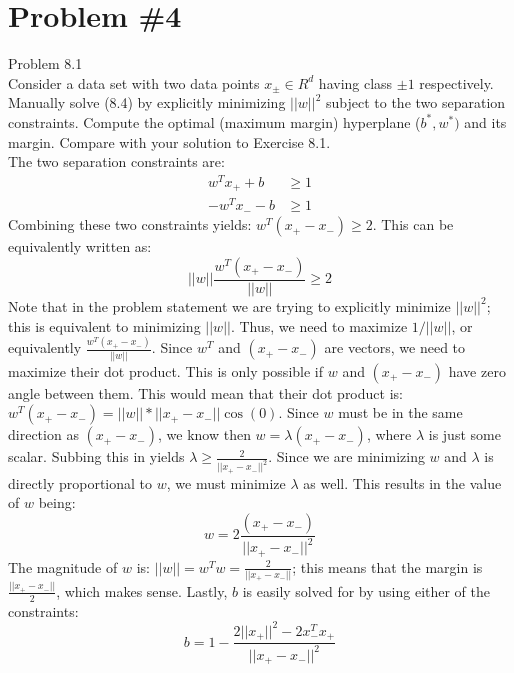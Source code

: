 \documentclass[12pt]{article}
\begin{document}
	\section*{Problem \#4}
	Problem 8.1 \\
	Consider a data set with two data points $x_{\pm} \in R^d$ having class $\pm1$ respectively. Manually solve (8.4) by explicitly minimizing $||w||^2$
	subject to the two separation constraints.
	Compute the optimal (maximum margin) hyperplane ($b^* , w^* )$ and its margin.
	Compare with your solution to Exercise 8.1. \\
	The two separation constraints are:
	\begin{align*}
		w^Tx_+ + b &\ge 1 \\
		-w^Tx_- -b &\ge 1  
	\end{align*}
	Combining these two constraints yields: $w^T(x_+ - x_-) \ge 2$. This can be equivalently written as:
	\begin{equation*}
		||w|| \frac{w^T(x_+ - x_-)}{||w||} \ge 2
	\end{equation*}
	Note that in the problem statement we are trying to explicitly minimize $||w||^2$; this is equivalent to minimizing $||w||$. Thus, we need to maximize $1/||w||$, or equivalently $\frac{w^T(x_+ - x_-)}{||w||}$. Since $w^T$ and $(x_+ -x_-)$ are vectors, we need to maximize their dot product. This is only possible if $w$ and $(x_+ -x_-)$ have zero angle between them. This would mean that their dot product is: $w^T(x_+ -x_-)= ||w||*||x_+ -x_-|| \cos(0)$. Since $w$ must be in the same direction as $(x_+ -x_-)$, we know then $w=\lambda (x_+ -x_-)$, where $\lambda$ is just some scalar. Subbing this in yields $\lambda \ge \frac{2}{||x_+-x_-||^2}$. Since we are minimizing $w$ and $\lambda$ is directly proportional to $w$, we must minimize $\lambda$ as well. This results in the value of $w$ being:
	\begin{equation*}
	w = 2 \frac{(x_+ - x_-)}{||x_+ - x_-||^2}
	\end{equation*}
	The magnitude of $w$ is: $||w|| = w^Tw=\frac{2}{||x_+-x_-||}$; this means that the margin is $\frac{||x_+-x_-||}{2}$, which makes sense. Lastly, $b$ is easily solved for by using either of the constraints:
	\begin{equation*}
		b = 1 - \frac{2||x_+||^2 - 2x_-^Tx_+}{||x_+-x_-||^2}
	\end{equation*} 
\end{document}
